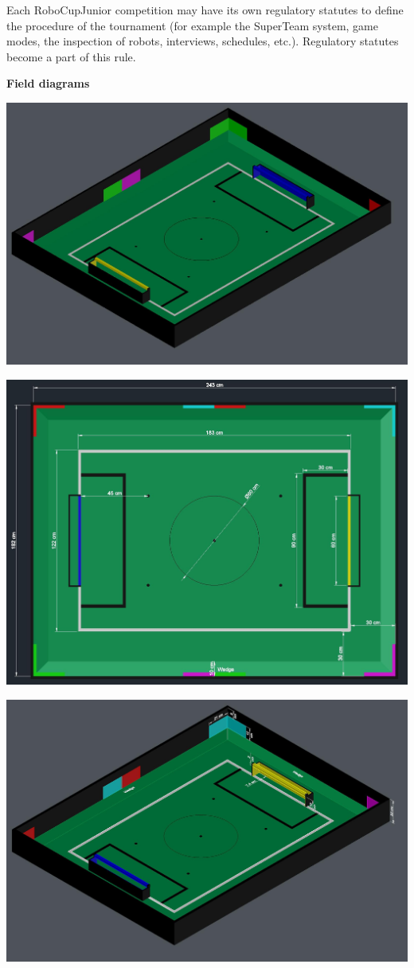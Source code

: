 \documentclass{article}
\begin{document}
Each RoboCupJunior competition may have its own regulatory statutes to define the procedure of the tournament (for example the SuperTeam system, game modes, the inspection of robots, interviews, schedules, etc.). Regulatory statutes become a part of this rule.

\textbf{Field diagrams}

\includegraphics[width=1\textwidth]{media/image5.jpeg}

\includegraphics[width=1\textwidth]{media/image6.jpeg}

\includegraphics[width=1\textwidth]{media/image7.jpeg}
\end{document}
